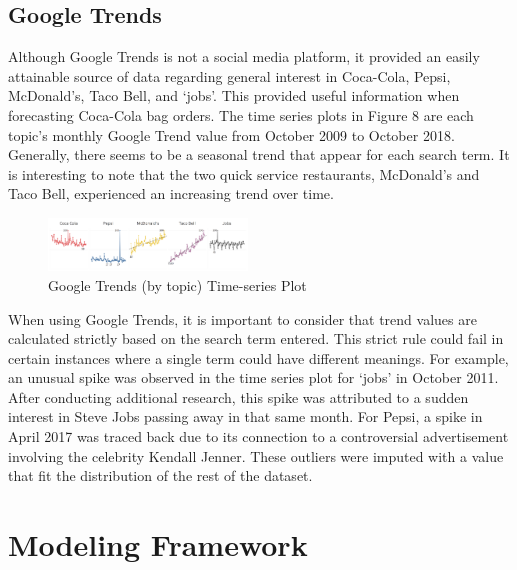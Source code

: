 \documentclass[12pt,oneside]{chicagocapstone}
\begin{document}
\hypertarget{google-trends}{%
\subsection*{Google Trends}\label{google-trends}}

Although Google Trends is not a social media platform, it provided an easily attainable source of data regarding general interest in Coca-Cola, Pepsi, McDonald's, Taco Bell, and `jobs'. This provided useful information when forecasting Coca-Cola bag orders.
The time series plots in Figure 8 are each topic's monthly Google Trend value from October 2009 to October 2018. Generally, there seems to be a seasonal trend that appear for each search term. It is interesting to note that the two quick service restaurants, McDonald's and Taco Bell, experienced an increasing trend over time.
\begin{figure}

{\centering \includegraphics[width=200px,angle = 0, scale=2.1]{figure/GoogleTrends} 

}

\caption{Google Trends (by topic) Time-series Plot}\label{fig:GoogleTrends}
\end{figure}
When using Google Trends, it is important to consider that trend values are calculated strictly based on the search term entered. This strict rule could fail in certain instances where a single term could have different meanings. For example, an unusual spike was observed in the time series plot for `jobs' in October 2011. After conducting additional research, this spike was attributed to a sudden interest in Steve Jobs passing away in that same month. For Pepsi, a spike in April 2017 was traced back due to its connection to a controversial advertisement involving the celebrity Kendall Jenner. These outliers were imputed with a value that fit the distribution of the rest of the dataset.

\newpage

\hypertarget{modeling-framework}{%
\section*{Modeling Framework}\label{modeling-framework}}
\end{document}

